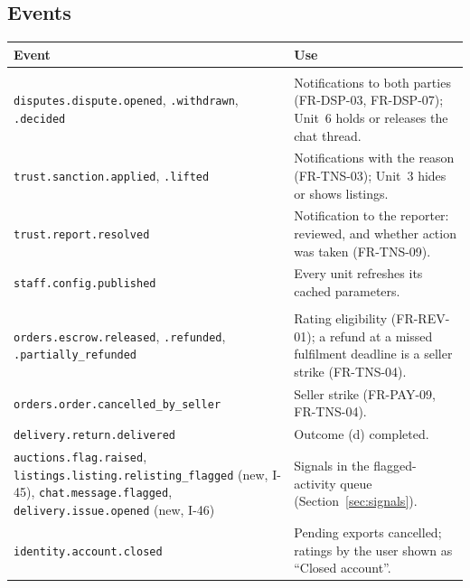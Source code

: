 \documentclass[11pt,a4paper]{article}
\newenvironment{dtable}[1]{\small\begin{longtable}{#1}}{\end{longtable}}
\begin{document}
\subsection{Events}
\begin{dtable}{@{}>{\raggedright\arraybackslash}p{6.2cm}>{\raggedright\arraybackslash}p{9.0cm}@{}}
\toprule
\textbf{Event} & \textbf{Use} \\ \midrule \endhead
\multicolumn{2}{@{}l}{\textit{Published (outbox, DC-6)}} \\
\texttt{disputes.dispute.opened}, \texttt{.withdrawn}, \texttt{.decided} & Notifications to both parties (FR-DSP-03, FR-DSP-07); Unit~6 holds or releases the chat thread. \\
\texttt{trust.sanction.applied}, \texttt{.lifted} & Notifications with the reason (FR-TNS-03); Unit~3 hides or shows listings. \\
\texttt{trust.report.resolved} & Notification to the reporter: reviewed, and whether action was taken (FR-TNS-09). \\
\texttt{staff.config.published} & Every unit refreshes its cached parameters. \\
\multicolumn{2}{@{}l}{\textit{Consumed (idempotent)}} \\
\texttt{orders.escrow.released}, \texttt{.refunded}, \texttt{.partially\_refunded} & Rating eligibility (FR-REV-01); a refund at a missed fulfilment deadline is a seller strike (FR-TNS-04). \\
\texttt{orders.order.cancelled\_by\_seller} & Seller strike (FR-PAY-09, FR-TNS-04). \\
\texttt{delivery.return.delivered} & Outcome (d) completed. \\
\texttt{auctions.flag.raised}, \texttt{listings.\allowbreak listing.\allowbreak relisting\_flagged} (new, I-45), \texttt{chat.message.flagged}, \texttt{delivery.issue.opened} (new, I-46) & Signals in the flagged-activity queue (Section~\ref{sec:signals}). \\
\texttt{identity.account.closed} & Pending exports cancelled; ratings by the user shown as ``Closed account''. \\
\bottomrule
\end{dtable}
\end{document}
